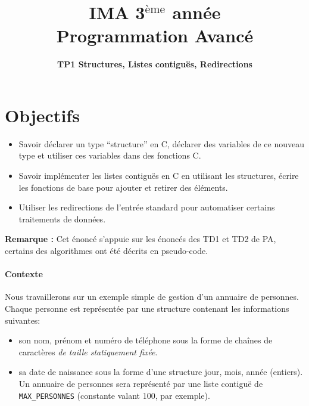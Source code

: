 \documentclass[final, pdftex, a4paper, openbib, ]{article}
\title{IMA 3$^{\mbox{\`eme}}$ année\\ Programmation Avancé
}
\author{\huge \textbf{TP1 Structures, Listes contiguës, Redirections}}
\date{}
\begin{document}
\posttitle{\par\end{center}}
\setlength{\droptitle}{-45pt}
\maketitle

\vspace{-1.7cm}
\section{Objectifs}

\begin{itemize}
	\item Savoir déclarer un type “structure” en C, déclarer des variables de ce nouveau type et utiliser ces variables dans des fonctions C.
	\item Savoir implémenter les listes contiguës en C en utilisant les structures, écrire les fonctions de base pour ajouter et retirer des éléments.
	\item Utiliser les redirections de l'entrée standard pour automatiser certains traitements de données.
\end{itemize}

\textbf{Remarque : } Cet énoncé s’appuie sur les énoncés des TD1 et TD2 de PA, certains des algorithmes ont été décrits en pseudo-code.

\paragraph{Contexte}
Nous travaillerons sur un exemple simple de gestion d’un annuaire de personnes.
Chaque personne est représentée par une structure contenant les informations suivantes:
\begin{itemize}
\item son nom, prénom et numéro de téléphone sous la forme de chaînes de caractères \textit{de taille statiquement fixée}.
\item sa date de naissance sous la forme d’une structure jour, mois, année (entiers).
Un annuaire de personnes sera représenté par une liste contiguë de \texttt{MAX\_PERSONNES} (constante valant 100, par exemple).
\end{itemize}
\end{document}
